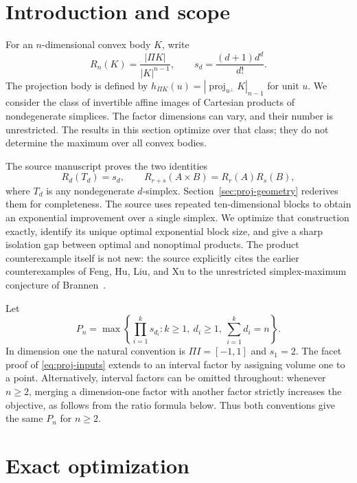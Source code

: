 \section{Introduction and scope}
\label{sec:projection-optimization}

For an $n$-dimensional convex body $K$, write
\[
 R_n(K)=\frac{|\Pi K|}{|K|^{n-1}},
 \qquad
 s_d=\frac{(d+1)d^d}{d!}.
\]
The projection body is defined by
$h_{\Pi K}(u)=|\operatorname{proj}_{u^\perp}K|_{n-1}$ for unit $u$.
We consider the class of invertible affine images of Cartesian products
of nondegenerate simplices. The factor dimensions can vary, and their
number is unrestricted. The results in this section optimize over that
class; they do not determine the maximum over all convex bodies.

The source manuscript \cite{OpenAIProjection} proves the two identities
\begin{equation}\label{eq:proj-inputs}
 R_d(T_d)=s_d,
 \qquad
 R_{r+s}(A\times B)=R_r(A)R_s(B),
\end{equation}
where $T_d$ is any nondegenerate $d$-simplex. Section~\ref{sec:proj-geometry} rederives them for completeness. The source uses repeated
ten-dimensional blocks to obtain an exponential improvement over a
single simplex. We optimize that construction exactly, identify its
unique optimal exponential block size, and give a sharp isolation gap
between optimal and nonoptimal products. The product counterexample
itself is not new: the source explicitly cites the earlier
counterexamples of Feng, Hu, Liu, and Xu \cite{FengReverse} to the
unrestricted simplex-maximum conjecture of Brannen~\cite{Brannen1996}.

Let
\begin{equation}\label{eq:proj-Pn}
 P_n=\max\left\{\prod_{i=1}^k s_{d_i}:
  k\ge1,\ d_i\ge1,\ \sum_{i=1}^k d_i=n\right\}.
\end{equation}
In dimension one the natural convention is $\Pi I=[-1,1]$ and $s_1=2$.
The facet proof of \eqref{eq:proj-inputs} extends to an interval factor
by assigning volume one to a point. Alternatively, interval factors can
be omitted throughout: whenever $n\ge2$, merging a dimension-one factor
with another factor strictly increases the objective, as follows from
the ratio formula below. Thus both conventions give the same $P_n$ for
$n\ge2$.

\section{Exact optimization}

